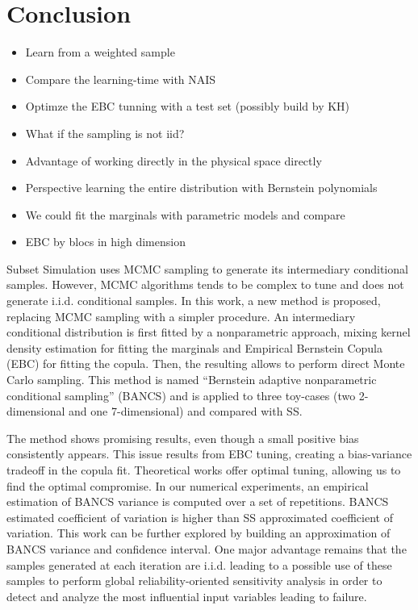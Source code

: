 \section{Conclusion}
\begin{itemize}
    \item Learn from a weighted sample
    \item Compare the learning-time with NAIS
    \item Optimze the EBC tunning with a test set (possibly build by KH)
    \item What if the sampling is not iid?
    \item Advantage of working directly in the physical space directly
    \item Perspective learning the entire distribution with Bernstein polynomials
    \item We could fit the marginals with parametric models and compare
    \item EBC by blocs in high dimension 
\end{itemize}


Subset Simulation uses MCMC sampling to generate its intermediary conditional samples. 
However, MCMC algorithms tends to be complex to tune and does not generate i.i.d. conditional samples. 
In this work, a new method is proposed, replacing MCMC sampling with a simpler procedure. 
An intermediary conditional distribution is first fitted by a nonparametric approach, mixing kernel density estimation for fitting the marginals and Empirical Bernstein Copula (EBC) for fitting the copula. 
Then, the resulting allows to perform direct Monte Carlo sampling. 
This method is named ``Bernstein adaptive nonparametric conditional sampling'' (BANCS) and is applied to three toy-cases (two 2-dimensional and one 7-dimensional) and compared with SS.

The method shows promising results, even though a small positive bias consistently appears. 
This issue results from EBC tuning, creating a bias-variance tradeoff in the copula fit. 
Theoretical works offer optimal tuning, allowing us to find the optimal compromise. 
In our numerical experiments, an empirical estimation of BANCS variance is computed over a set of repetitions. 
BANCS estimated coefficient of variation is higher than SS approximated coefficient of variation. 
This work can be further explored by building an approximation of BANCS variance and confidence interval. 
One major advantage remains that the samples generated at each iteration are i.i.d. leading to a possible use of these samples to perform global reliability-oriented sensitivity analysis \citep{marrel_chabridon_2021} 
in order to detect and analyze the most influential input variables leading to failure.



